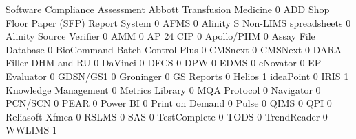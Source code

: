 \documentclass{article}
\begin{document}
\begin{Schunk}
\begin{Soutput}
                                           Software Compliance Assessment
  Abbott Transfusion Medicine                                           0
  ADD Shop Floor Paper (SFP) Report System                              0
  AFMS                                                                  0
  Alinity S Non-LIMS spreadsheets                                       0
  Alinity Source Verifier                                               0
  AMM                                                                   0
  AP 24 CIP                                                             0
  Apollo/PHM                                                            0
  Assay File Database                                                   0
  BioCommand Batch Control Plus                                         0
  CMSnext                                                               0
  CMSNext                                                               0
  DARA Filler DHM and RU                                                0
  DaVinci                                                               0
  DFCS                                                                  0
  DPW                                                                   0
  EDMS                                                                  0
  eNovator                                                              0
  EP Evaluator                                                          0
  GDSN/GS1                                                              0
  Groninger                                                             0
  GS Reports                                                            0
  Helios                                                                1
  ideaPoint                                                             0
  IRIS                                                                  1
  Knowledge Management                                                  0
  Metrics Library                                                       0
  MQA Protocol                                                          0
  Navigator                                                             0
  PCN/SCN                                                               0
  PEAR                                                                  0
  Power BI                                                              0
  Print on Demand                                                       0
  Pulse                                                                 0
  QIMS                                                                  0
  QPI                                                                   0
  Reliasoft Xfmea                                                       0
  RSLMS                                                                 0
  SAS                                                                   0
  TestComplete                                                          0
  TODS                                                                  0
  TrendReader                                                           0
  WWLIMS                                                                1
                                          

\end{Soutput}
\end{Schunk}
\end{document}
